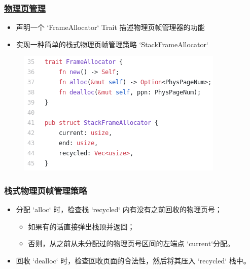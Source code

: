 \begin{frame}
    \frametitle{\href{https://rcore-os.github.io/rCore-Tutorial-Book-v3/chapter4/4sv39-implementation-2.html\#id2}{物理页管理}}
% 
% 
% 
        \begin{itemize}
        \item 声明一个 `FrameAllocator` Trait 描述物理页帧管理器的功能
        \item 实现一种简单的栈式物理页帧管理策略 `StackFrameAllocator` 
        \end{itemize}
% 
    \begin{figure}
        \centering
        \includegraphics[width=0.6\linewidth]{figs/frame_allocator-L35.png}
    \end{figure}
% 
% 
\end{frame}
\begin{frame}
    \frametitle{栈式物理页帧管理策略}
% 
        \begin{itemize}
        \item 分配 `alloc` 时，检查栈 `recycled` 内有没有之前回收的物理页号；
            \begin{itemize}
            \item 如果有的话直接弹出栈顶并返回；
            \item 否则，从之前从未分配过的物理页号区间的左端点 `current`分配。
            \end{itemize}
        \item 回收 `dealloc` 时，检查回收页面的合法性，然后将其压入 `recycled` 栈中。
        \end{itemize}
% 
% 
% 
% 
\end{frame}
